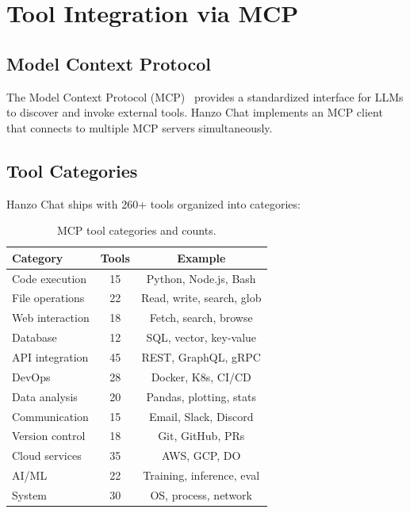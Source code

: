 \section{Tool Integration via MCP}

\label{sec:tools}

\subsection{Model Context Protocol}

The Model Context Protocol (MCP)~\cite{anthropic2024mcp} provides a standardized interface for LLMs to discover and invoke external tools. Hanzo Chat implements an MCP client that connects to multiple MCP servers simultaneously.

\subsection{Tool Categories}

Hanzo Chat ships with 260+ tools organized into categories:

\begin{table}[H]
\centering
\small
\begin{tabular}{lcc}
\toprule
\textbf{Category} & \textbf{Tools} & \textbf{Example} \\
\midrule
Code execution & 15 & Python, Node.js, Bash \\
File operations & 22 & Read, write, search, glob \\
Web interaction & 18 & Fetch, search, browse \\
Database & 12 & SQL, vector, key-value \\
API integration & 45 & REST, GraphQL, gRPC \\
DevOps & 28 & Docker, K8s, CI/CD \\
Data analysis & 20 & Pandas, plotting, stats \\
Communication & 15 & Email, Slack, Discord \\
Version control & 18 & Git, GitHub, PRs \\
Cloud services & 35 & AWS, GCP, DO \\
AI/ML & 22 & Training, inference, eval \\
System & 30 & OS, process, network \\
\bottomrule
\end{tabular}
\caption{MCP tool categories and counts.}
\label{tab:tools}
\end{table}


